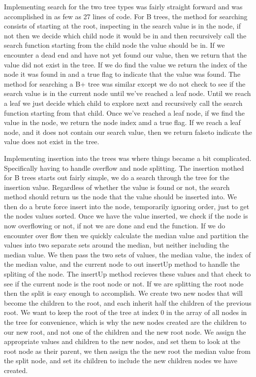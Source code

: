 Implementing search for the two tree types was fairly straight forward
and was accomplished in as few as 27 lines of code.  For B trees, the
method for searching consists of starting at the root, inspecting in
the search value is in the node, if not then we decide which child
node it would be in and then recursively call the search function
starting from the child node the value should be in.  If we encounter
a dead end and have not yet found our value, then we return that the
value did not exist in the tree.  If we do find the value we return
the index of the node it was found in and a true flag to indicate that
the value was found.  The method for searching a B+ tree was similar
except we do not check to see if the search value is in the current
node until we've reached a leaf node.  Until we reach a leaf we just
decide which child to explore next and recursively call the search
function starting from that child.  Once we've reached a leaf node, if
we find the value in the node, we return the node index amd a true
flag.  If we reach a leaf node, and it does not contain our search
value, then we return falseto indicate the value does not exist in the
tree.

Implementing insertion into the trees was where things became a bit
complicated.  Specifically having to handle overflow and node
splitting.  The insertion mothed for B trees starts out fairly simple,
we do a search through the tree for the insertion value.  Regardless
of whether the value is found or not, the search method should return
us the node that the value should be inserted into.  We then do a
brute force insert into the node, temporarily ignoring order, just to
get the nodes values sorted.  Once we have the value inserted, we
check if the node is now overflowing or not, if not we are done and
end the function.  If we do encounter over flow then we quickly
calculate the median value and partition the values into two separate
sets around the median, but neither including the median value.  We
then pass the two sets of values, the median value, the index of the
median value, and the current node to out insertUp method to handle
the spliting of the node.  The insertUp method recieves these values
and that check to see if the current node is the root node or not.  If
we are splitting the root node then the split is easy enough to
accomplish.  We create two new nodes that will become the children to
the root, and each inherit half the children of the previous root.  We
want to keep the root of the tree at index 0 in the array of all nodes
in the tree for convenience, which is why the new nodes created are
the children to our new root, and not one of the children and the new
root node.  We assign the appropriate values and children to the new
nodes, and set them to look at the root node as their parent, we then
assign the the new root the median value from the split node, and set
its children to include the new children nodes we have created.

